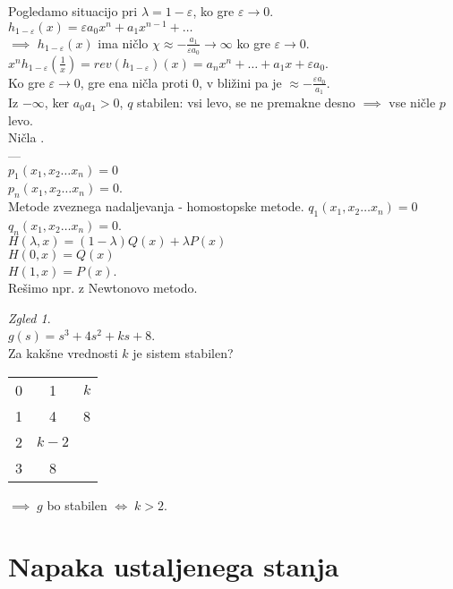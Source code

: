 \documentclass[a4paper, 12pt]{book}
\theoremstyle{definition}
\theoremstyle{remark}
\newtheorem*{exmp}{Zgled}
\begin{document}
Pogledamo situacijo pri $\lambda = 1-\varepsilon$, ko gre $\varepsilon \to 0$. \\
$h_{1-\varepsilon}(x) = \varepsilon a_{0}x^n + a_1 x^{n-1} + \dots$ \\
$\implies$ $h_{1-\varepsilon}(x)$ ima ničlo $\chi \approx - \frac{a_1}{\varepsilon a_0} \to \infty$
ko gre $\varepsilon \to 0$. \\
$x^n h_{1-\varepsilon}\left(\frac{1}{x}\right) = rev(h_{1-\varepsilon})(x)
= a_n x^n + \dots + a_1 x + \varepsilon a_0$. \\
Ko gre $\varepsilon \to 0$, gre ena ničla proti 0, v bližini pa je $\approx -\frac{\varepsilon a_0}{a_1}$. \\
Iz $-\infty$, ker $a_0 a_1 > 0$, $q$ stabilen: vsi levo, se ne premakne desno $\implies$ vse ničle $p$ levo. \\
Ničla . \\
--- \\
$p_1(x_1, x_2 \dots x_n) = 0$ \\
$p_n(x_1, x_2 \dots x_n) = 0$. \\
Metode zveznega nadaljevanja - homostopske metode.
$q_1(x_1, x_2 \dots x_n) = 0$ \\
$q_n(x_1, x_2 \dots x_n) = 0$. \\
$H(\lambda, x) = (1-\lambda) Q(x) + \lambda P(x)$ \\
$H(0, x) = Q(x)$ \\
$H(1, x) = P(x)$. \\
Rešimo npr. z Newtonovo metodo.
\begin{exmp} \text{} \\
    $g(s) = s^3 + 4s^2 + ks + 8$. \\
    Za kakšne vrednosti $k$ je sistem stabilen?
    \begin{center}
        \begin{tabular}{c | c c}
            & & \\
            \hline
            0 & 1 & $k$ \\
            1 & 4 & 8 \\
            2 & $k-2$ & \\
            3 & 8
        \end{tabular}
    \end{center}
    $\implies \; g$ bo stabilen $\iff \; k > 2$.
\end{exmp}


\section{Napaka ustaljenega stanja}
\end{document}
